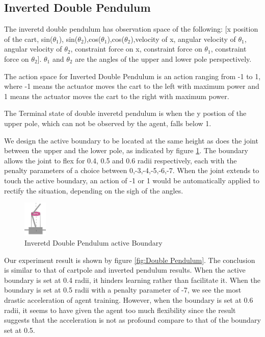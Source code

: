 \documentclass[journal]{IEEEtran}
\begin{document}
\subsection{Inverted Double Pendulum}
The inveretd double pendulum has observation space of the following: [x position of the cart, sin($\theta_1$), sin($\theta_2$),cos($\theta_1$),cos($\theta_2$),velocity of x, angular velocity of $\theta_1$, angular velocity of $\theta_2$, constraint force on x, constraint force on $\theta_1$, constraint force on $\theta_2$]. $\theta_1$ and $\theta_2$ are the angles of the upper and lower pole perspectively.

The action space for Inverted Double Pendulum is an action ranging from -1 to 1, where -1 means the actuator moves the cart to the left with maximum power and 1 means the actuator moves the cart to the right with maximum power.

The Terminal state of double inveretd pendulum is when the y postion of the upper pole, which can not be observed by the agent, falls below 1.

We design the active boundary to be located at the same height as does the joint between the upper and the lower pole, as indicated by figure \ref{fig:doublePB}. The boundary allows the joint to flex for 0.4, 0.5 and 0.6 radii respectively, each with the penalty parameters of a choice between 0,-3,-4,-5,-6,-7. When the joint extends to touch the active boundary, an action of -1 or 1 would be automatically applied to rectify the situation, depending on the sigh of the angles.

\begin{figure}
     \centering
      \includegraphics[width=0.1\textwidth]{cartpole2.png}
      \caption{Inveretd Double Pendulum active Boundary}
      \label{fig:doublePB}
\end{figure}

Our experiment result is shown by figure \ref{fig:Double Pendulum}. The conclusion is similar to that of cartpole and inverted pendulum results. When the active boundary is set at 0.4 radii, it hinders learning rather than facilitate it. When the boundary is set at 0.5 radii with a penalty parameter of -7, we see the most drastic acceleration of agent training. However, when the boundary is set at 0.6 radii, it seems to have given the agent too much flexibility since the result suggests that the acceleration is not as profound compare to that of the boundary set at 0.5.
\end{document}
